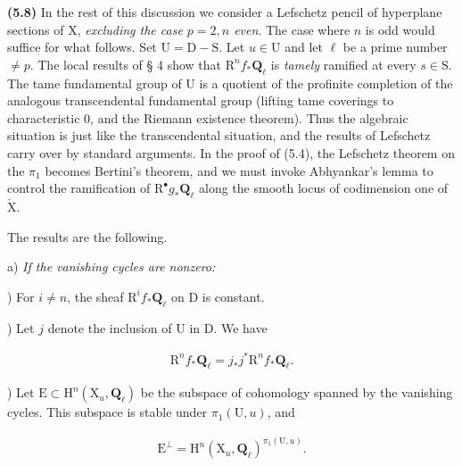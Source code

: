 \documentclass[10pt,leqno]{article}
\begin{document}
\noindent \textbf{(5.8)} In the rest of this discussion we consider a Lefschetz pencil of hyperplane sections of \(\mathrm{X}\), \emph{excluding the case \(p=2, n\) even}. The case where \(n\) is odd would suffice for what follows. Set \(\mathrm{U}=\mathrm{D}- \mathrm{S}\). Let \(u\in \mathrm{U}\) and let \(\ell \) be a prime number \(\ne p\). The local results of § 4 show that \(\mathrm{R}^{n} f_{*}\mathbf{Q}_{\ell }\) is \emph{tamely} ramified at every \(s\in \mathrm{S}\). The tame fundamental group of \(\mathrm{U}\) is a quotient of the profinite completion of the analogous transcendental fundamental group (lifting tame coverings to characteristic 0, and the Riemann existence theorem). Thus the algebraic situation is just like the transcendental situation, and the results of Lefschetz carry over by standard arguments. In the proof of (5.4), the Lefschetz theorem on the \(\pi _{1}\) becomes Bertini's theorem, and we must invoke Abhyankar's lemma to control the ramification of \(\mathrm{R}^{\bullet} g_{*}\mathbf{Q}_{\ell }\) along the smooth locus of codimension one of \(\check{\mathrm{X}}\).\par

\noindent The results are the following.\par

\noindent a) \emph{If the vanishing cycles are nonzero:}\par

) For \(i\ne n\), the sheaf \(\mathrm{R}^{i} f_{*}\mathbf{Q}_{\ell }\) on \(\mathrm{D}\) is constant.\par

) Let \(j\) denote the inclusion of \(\mathrm{U}\) in \(\mathrm{D}\). We have\par

\begin{equation*}\begin{gathered}\mathrm{R}^{n} f_{*}\mathbf{Q}_{\ell } = j_{*}j^{*}\mathrm{R}^{n} f_{*}\mathbf{Q}_{\ell }.\end{gathered}\end{equation*}

) Let \(\mathrm{E}\subset \mathrm{H}^{n}(\mathrm{X}_{u},\mathbf{Q}_{\ell })\) be the subspace of cohomology spanned by the vanishing cycles. This subspace is stable under \(\pi _{1}(\mathrm{U},u)\), and\par

\begin{equation*}\begin{gathered}\mathrm{E}^{\perp } = \mathrm{H}^{n}(\mathrm{X}_{u},\mathbf{Q}_{\ell })^{\pi _{1}(\mathrm{U},u)}.\end{gathered}\end{equation*}
\end{document}

